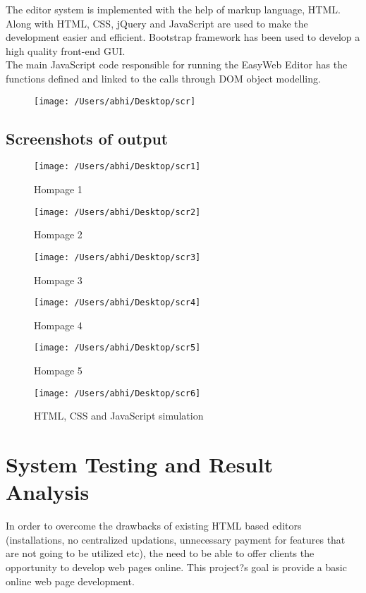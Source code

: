 \documentclass[12pt,a4paper]{article}
\begin{document}
The editor system is implemented with the help of markup language, HTML. Along with HTML, CSS, jQuery and JavaScript are used to make the development easier and efficient. Bootstrap framework has been used to develop a high quality front-end GUI.\\

The main JavaScript code responsible for running the EasyWeb Editor has the functions defined and linked to the calls through DOM object modelling.
\begin{figure}[H]
\centering
\texttt{[image: /Users/abhi/Desktop/scr]}
\end{figure}

\subsection{Screenshots of output}
\begin{figure}[H]
\centering
\texttt{[image: /Users/abhi/Desktop/scr1]}
\caption{Hompage 1}
\end{figure}


\begin{figure}[H]
\centering
\texttt{[image: /Users/abhi/Desktop/scr2]}
\caption{Hompage 2}
\end{figure}

\begin{figure}[H]
\centering
\texttt{[image: /Users/abhi/Desktop/scr3]}
\caption{Hompage 3}
\end{figure}

\begin{figure}[H]
\centering
\texttt{[image: /Users/abhi/Desktop/scr4]}
\caption{Hompage 4}
\end{figure}


\begin{figure}[H]
\centering
\texttt{[image: /Users/abhi/Desktop/scr5]}
\caption{Hompage 5}
\end{figure}

\begin{figure}[H]
\centering
\texttt{[image: /Users/abhi/Desktop/scr6]}
\caption{HTML, CSS and JavaScript simulation}
\end{figure}

\newpage
\section{System Testing and Result Analysis}
In order to overcome the drawbacks of existing HTML based editors (installations, no centralized updations, unnecessary payment for features that are not going to be utilized etc), the need to be able to offer clients the opportunity to develop web pages online. This project?s goal is provide a basic online web page development.\\
\end{document}
